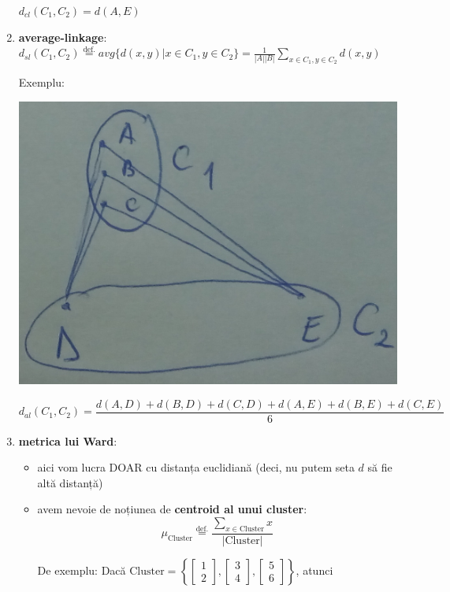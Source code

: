 \documentclass[12pt]{article}
\begin{document}
\begin{enumerate}
		$d_{cl}(C_1,C_2) = d(A,E)$
		
		\item \textbf{average-linkage}: $d_{sl}(C_1,C_2) \stackrel{\text{def.}}{=} avg\{d(x,y) | x\in C_1, y\in C_2\} = \frac{1}{|A| |B|} \sum_{x \in C_1, y\in C_2} d(x,y)$
		
		Exemplu: 
		
		\begin{center}
			\includegraphics{screenshot006}
		\end{center}
		
		
		$d_{al}(C_1,C_2) = \dfrac{d(A,D) + d(B,D) + d(C,D) + d(A,E) + d(B,E) + d(C,E)}{6}$
		
		\item \textbf{metrica lui Ward}:
		\begin{itemize}
			\item aici vom lucra DOAR cu distanța euclidiană (deci, nu putem seta $d$ să fie altă distanță)
			\item avem nevoie de noțiunea de \textbf{centroid al unui cluster}:
			$$\mu_\text{Cluster} \stackrel{\text{def.}}{=} \frac{\sum_{x \in \text{Cluster}} x}{|\text{Cluster}|}$$
			
			De exemplu: Dacă $\text{Cluster} = \left\{\begin{bmatrix}
			1\\
			2
			\end{bmatrix}, \begin{bmatrix}
			3\\
			4
			\end{bmatrix}, \begin{bmatrix}
			5\\
			6
			\end{bmatrix}\right\}$, atunci
			

\end{itemize}
\end{enumerate}
\end{document}
